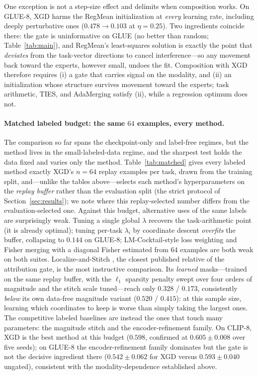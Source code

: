 \documentclass{article} %
\begin{document}
One exception is not a step-size effect and delimits when composition works. On GLUE-8, XGD harms the RegMean initialization at \emph{every} learning rate, including deeply perturbative ones ($0.478\to0.103$ at $\eta=0.25$). Two ingredients coincide there: the gate is uninformative on GLUE (no better than random; Table~\ref{tab:main}), and RegMean's least-squares solution is exactly the point that \emph{deviates} from the task-vector directions to cancel interference---so any movement back toward the experts, however small, undoes the fit. Composition with XGD therefore requires (i) a gate that carries signal on the modality, and (ii) an initialization whose structure survives movement toward the experts; task arithmetic, TIES, and AdaMerging satisfy (ii), while a regression optimum does not.

\paragraph{Matched labeled budget: the same $64$ examples, every method.}
The comparison so far spans the checkpoint-only and label-free regimes, but the method lives in the small-labeled-data regime, and the sharpest test holds the data fixed and varies only the method. Table~\ref{tab:matched} gives every labeled method exactly XGD's $n=64$ replay examples per task, drawn from the training split, and---unlike the tables above---selects each method's hyperparameters on the \emph{replay buffer} rather than the evaluation split (the strict protocol of Section~\ref{sec:results}); we note where this replay-selected number differs from the evaluation-selected one. Against this budget, alternative uses of the same labels are surprisingly weak. Tuning a single global $\lambda$ recovers the task-arithmetic point (it is already optimal); tuning per-task $\lambda_i$ by coordinate descent \emph{overfits} the buffer, collapsing to $0.144$ on GLUE-8; LM-Cocktail-style loss weighting \citep{xiao2024lmcocktail} and Fisher merging \citep{matena2022fisher} with a diagonal Fisher estimated from $64$ examples are both weak on both suites. Localize-and-Stitch \citep{he2024localize}, the closest published relative of the attribution gate, is the most instructive comparison. Its \emph{learned} masks---trained on the same replay buffer, with the $\ell_1$ sparsity penalty swept over four orders of magnitude and the stitch scale tuned---reach only $0.328$ / $0.173$, consistently \emph{below} its own data-free magnitude variant ($0.520$ / $0.415$): at this sample size, learning which coordinates to keep is worse than simply taking the largest ones. The competitive labeled baselines are instead the ones that touch many parameters: the magnitude stitch and the encoder-refinement family. On CLIP-8, XGD is the best method at this budget ($0.598$, confirmed at $0.605\pm0.008$ over five seeds); on GLUE-8 the encoder-refinement family dominates but the gate is not the decisive ingredient there ($0.542\pm0.062$ for XGD versus $0.593\pm0.040$ ungated), consistent with the modality-dependence established above.
\end{document}
